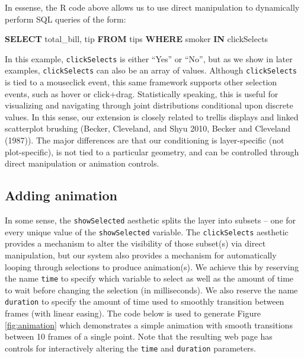 \documentclass[12pt,]{article}
\newenvironment{Shaded}{\begin{snugshade}}{\end{snugshade}}
\newcommand{\KeywordTok}[1]{\textcolor[rgb]{0.13,0.29,0.53}{\textbf{#1}}}
\newcommand{\NormalTok}[1]{#1}
\theoremstyle{definition}
\theoremstyle{definition}
\theoremstyle{remark}
\begin{document}
In essense, the R code above allows us to use direct manipulation to
dynamically perform SQL queries of the form:

\begin{Shaded}
\begin{Highlighting}[]
\KeywordTok{SELECT}\NormalTok{ total_bill, tip }\KeywordTok{FROM}\NormalTok{ tips}
  \KeywordTok{WHERE}\NormalTok{ smoker }\KeywordTok{IN}\NormalTok{ clickSelects}
\end{Highlighting}
\end{Shaded}

In this example, \texttt{clickSelects} is either ``Yes'' or ``No'', but
as we show in later examples, \texttt{clickSelects} can also be an array
of values. Although \texttt{clickSelects} is tied to a mouseclick event,
this same framework supports other selection events, such as hover or
click+drag. Statistically speaking, this is useful for visualizing and
navigating through joint distributions conditional upon discrete values.
In this sense, our extension is closely related to trellis displays and
linked scatterplot brushing (Becker, Cleveland, and Shyu 2010, Becker
and Cleveland (1987)). The major differences are that our conditioning
is layer-specific (not plot-specific), is not tied to a particular
geometry, and can be controlled through direct manipulation or animation
controls.

\subsection{Adding animation}\label{animation}

In some sense, the \texttt{showSelected} aesthetic splits the layer into
subsets -- one for every unique value of the \texttt{showSelected}
variable. The \texttt{clickSelects} aesthetic provides a mechanism to
alter the visibility of those subset(s) via direct manipulation, but our
system also provides a mechanism for automatically looping through
selections to produce animation(s). We achieve this by reserving the
name \texttt{time} to specify which variable to select as well as the
amount of time to wait before changing the selection (in milliseconds).
We also reserve the name \texttt{duration} to specify the amount of time
used to smoothly transition between frames (with linear easing). The
code below is used to generate Figure \ref{fig:animation} which
demonstrates a simple animation with smooth transitions between 10
frames of a single point. Note that the resulting web page has controls
for interactively altering the \texttt{time} and \texttt{duration}
parameters.
\end{document}
